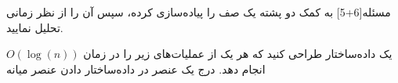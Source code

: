 
‌مسئله[6+5]
به کمک دو پشته یک صف را پیاده‌سازی کرده، سپس آن را از نظر زمانی تحلیل نمایید.

یک داده‌ساختار طراحی کنید که هر یک از عملیات‌های زیر را در زمان
$O(\log(n))$
انجام دهد.
        درج یک عنصر در داده‌ساختار
        دادن عنصر میانه













